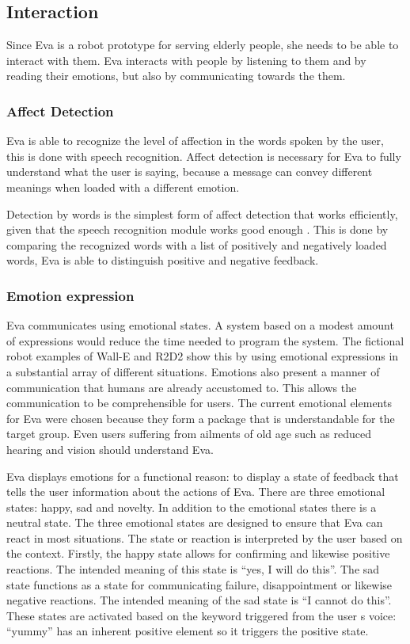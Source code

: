 \documentclass[project_eva.tex]{subfiles}
\begin{document}
\subsection*{Interaction}
Since Eva is a robot prototype for serving elderly people, she needs to be able to interact with them. Eva interacts with people by listening to them and by reading their emotions, but also by communicating towards the them.

\subsubsection*{Affect Detection}
Eva is able to recognize the level of affection in the words spoken by the user, this is done with speech recognition. Affect detection is necessary for Eva to fully understand what the user is saying, because a message can convey different meanings when loaded with a different emotion.

Detection by words is the simplest form of affect detection that works efficiently, given that the speech recognition module works good enough \cite{affection} . This is done by comparing the recognized words with a list of positively and negatively loaded words, Eva is able to distinguish positive and negative feedback.
 
\subsubsection*{Emotion expression}
\label{sec:Emotion expression}
Eva communicates using emotional states. A system based on a modest amount of expressions would reduce the time needed 
to program the system. The fictional robot examples of Wall-E and R2D2 show this by using emotional expressions in a 
substantial array of different situations. Emotions also present a manner of communication that humans are already 
accustomed to. This allows the communication to be comprehensible for users. The current emotional elements for Eva were chosen because they form a package that is understandable for the target group. Even users suffering from ailments of old age such as reduced hearing and vision should understand Eva. 

Eva displays emotions for a functional reason: to display a state of feedback that tells the user information about the 
actions of Eva. There are three emotional states: happy, sad and novelty. In  addition to the emotional states there is a 
neutral state. The three emotional states are designed to ensure that Eva can react in most situations. The state or 
reaction is interpreted by the user based on the context. Firstly, the happy  state allows for confirming and likewise 
positive reactions. The intended meaning of this state is ``yes, I will do this''. The sad state functions as a state for communicating failure, disappointment or likewise negative reactions. The intended meaning of the sad state  is ``I cannot do this''. These states are activated based on the keyword triggered from the user \textquotesingle s voice: ``yummy'' has an inherent positive element so it triggers the positive state.
\end{document}
